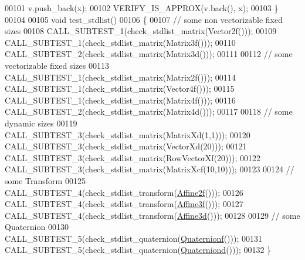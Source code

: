\begin{DoxyCode}
00101   v.push\_back(x);
00102   VERIFY\_IS\_APPROX(v.back(), x);
00103 \}
00104 
00105 \textcolor{keywordtype}{void} test\_stdlist()
00106 \{
00107   \textcolor{comment}{// some non vectorizable fixed sizes}
00108   CALL\_SUBTEST\_1(check\_stdlist\_matrix(Vector2f()));
00109   CALL\_SUBTEST\_1(check\_stdlist\_matrix(Matrix3f()));
00110   CALL\_SUBTEST\_2(check\_stdlist\_matrix(Matrix3d()));
00111 
00112   \textcolor{comment}{// some vectorizable fixed sizes}
00113   CALL\_SUBTEST\_1(check\_stdlist\_matrix(Matrix2f()));
00114   CALL\_SUBTEST\_1(check\_stdlist\_matrix(Vector4f()));
00115   CALL\_SUBTEST\_1(check\_stdlist\_matrix(Matrix4f()));
00116   CALL\_SUBTEST\_2(check\_stdlist\_matrix(Matrix4d()));
00117 
00118   \textcolor{comment}{// some dynamic sizes}
00119   CALL\_SUBTEST\_3(check\_stdlist\_matrix(MatrixXd(1,1)));
00120   CALL\_SUBTEST\_3(check\_stdlist\_matrix(VectorXd(20)));
00121   CALL\_SUBTEST\_3(check\_stdlist\_matrix(RowVectorXf(20)));
00122   CALL\_SUBTEST\_3(check\_stdlist\_matrix(MatrixXcf(10,10)));
00123 
00124   \textcolor{comment}{// some Transform}
00125   CALL\_SUBTEST\_4(check\_stdlist\_transform(\hyperlink{group___geometry___module_ga2c1ea05a21899654ee3a2e3f91fa30e0}{Affine2f}()));
00126   CALL\_SUBTEST\_4(check\_stdlist\_transform(\hyperlink{group___geometry___module_ga17e901de8ff882aea7845c5457db6a4f}{Affine3f}()));
00127   CALL\_SUBTEST\_4(check\_stdlist\_transform(\hyperlink{group___geometry___module_gaaffa69d3143826efeb84e5d6c56a4c78}{Affine3d}()));
00128 
00129   \textcolor{comment}{// some Quaternion}
00130   CALL\_SUBTEST\_5(check\_stdlist\_quaternion(\hyperlink{group___geometry___module_ga785b13a5a87f9bf55d4eba51ead2dcf0}{Quaternionf}()));
00131   CALL\_SUBTEST\_5(check\_stdlist\_quaternion(\hyperlink{group___geometry___module_ga6e77eb8b6aae0e04be2db88107dbc642}{Quaterniond}()));
00132 \}
\end{DoxyCode}
